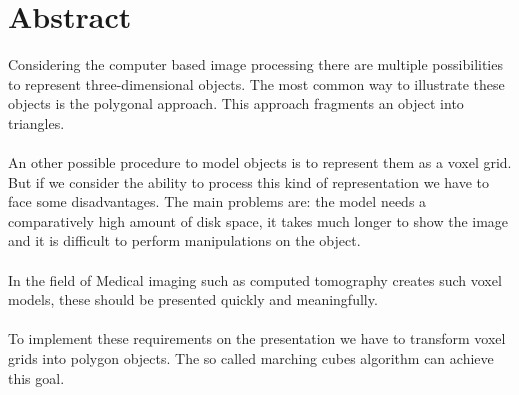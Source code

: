\chapter{Abstract}

Considering the computer based image processing there are multiple possibilities to represent three-dimensional objects. The most common way to illustrate these objects is the polygonal approach. This approach fragments an object into triangles.
\\\\
An other possible procedure to model objects is to represent them as a voxel grid. But if we consider the ability to process this kind of representation we have to face some disadvantages. The main problems are: the model needs a comparatively high amount of disk space, it takes much longer to show the image and it is difficult to perform manipulations on the object.
\\\\
In the field of Medical imaging such as computed tomography creates such voxel models, these should be presented quickly and meaningfully.
\\\\
To implement these requirements on the presentation we have to transform voxel grids into polygon objects. The so called marching cubes algorithm can achieve this goal.